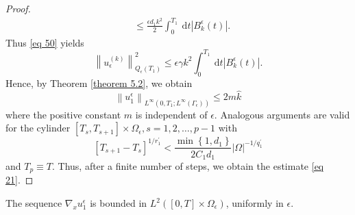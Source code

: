 \begin{proof}
\begin{equation}
\begin{aligned}
& \leq \frac{\epsilon d_{1} k^{2}}{2} \int_{0}^{T_{1}} \mathrm{~d} t\left|B_{k}^{\epsilon}(t)\right| .
\end{aligned}
\label{eq 54}\end{equation}
Thus \eqref{eq 50} yields
\begin{equation}
  \left\|u_{\epsilon}^{(k)}\right\|_{Q_{\epsilon}\left(T_{1}\right)}^{2} \leq \epsilon \gamma k^{2} \int_{0}^{T_{1}} \mathrm{~d} t\left|B_{k}^{\epsilon}(t)\right| .
\label{eq 55}\end{equation}
Hence, by Theorem \eqref{theorem 5.2}, we obtain
$$
\left\|u_{1}^{\epsilon}\right\|_{L^{\infty}\left(0, T_{1} ; L^{\infty}\left(\Gamma_{\epsilon}\right)\right)} \leq 2 m \hat{k}
$$
where the positive constant $m$ is independent of $\epsilon$. Analogous arguments are valid for the cylinder $\left[T_{s}, T_{s+1}\right] \times \Omega_{\epsilon}, s=1,2, \ldots, p-1$ with
$$
\left[T_{s+1}-T_{s}\right]^{1 / r_{1}^{\prime}}<\frac{\min \left\{1, d_{1}\right\}}{2 C_{1} d_{1}}|\Omega|^{-1 / q_{1}^{\prime}}
$$
and $T_{p} \equiv T$. Thus, after a finite number of steps, we obtain the estimate \eqref{eq 21}.
\end{proof}
\begin{lemma}
  The sequence $\nabla_{x} u_{1}^{\epsilon}$ is bounded in $L^{2}\left([0, T] \times \Omega_{\epsilon}\right)$, uniformly in $\epsilon$.
\label{lemma 5.4}\end{lemma}
